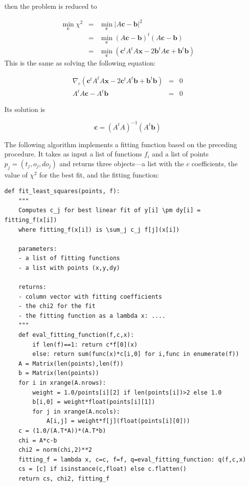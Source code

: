 \documentclass[justified,sixbynine]{tufte-book}
\def\ft{\small\tt}
\theoremstyle{plain}%
\theoremstyle{definition}
\theoremstyle{remark}
\begin{document}
\begin{fullwidth}
then the problem is reduced to

\begin{eqnarray}
\min_{\mathbf{c}}\chi^2 &=& \min_{\mathbf{c}} |A\mathbf{c}-\mathbf{b}|^2 \\
  &=& \min_{\mathbf{c}} (A\mathbf{c}-\mathbf{b})^t (A\mathbf{c}-\mathbf{b}) \\
  &=& \min_{\mathbf{c}} (\mathbf{c}^t A^t A \mathbf x - 2\mathbf{b}^t A \mathbf{c} + \mathbf{b}^t \mathbf{b})
\end{eqnarray}
This is the same as solving the following equation:

\begin{eqnarray}
\nabla_{c} (\mathbf{c}^t A^t A \mathbf x - 2\mathbf{c}^t A^t \mathbf{b} + \mathbf{b}^t\mathbf{b}) &=& 0 \\
A^t A \mathbf{c} - A^t \mathbf{b} &=& 0
\end{eqnarray}

Its solution is

\begin{equation}
\mathbf{c} = (A^t A)^{-1} (A^t \mathbf{b})
\end{equation}

The following algorithm implements a fitting function based on the preceding procedure. It takes as input a list of functions $f_i$ and a list of points $p_j=(t_j,o_j,do_j)$ and returns three objects---a list with the $c$ coefficients, the value of $\chi^2$ for the best fit, and the fitting function:

\begin{lstlisting}[caption={in file: {\ft nlib.py}}]
def fit_least_squares(points, f):
    """
    Computes c_j for best linear fit of y[i] \pm dy[i] = fitting_f(x[i])
    where fitting_f(x[i]) is \sum_j c_j f[j](x[i])

    parameters:
    - a list of fitting functions
    - a list with points (x,y,dy)

    returns:
    - column vector with fitting coefficients
    - the chi2 for the fit
    - the fitting function as a lambda x: ....
    """
    def eval_fitting_function(f,c,x):
        if len(f)==1: return c*f[0](x)
        else: return sum(func(x)*c[i,0] for i,func in enumerate(f))
    A = Matrix(len(points),len(f))
    b = Matrix(len(points))
    for i in xrange(A.nrows):
        weight = 1.0/points[i][2] if len(points[i])>2 else 1.0
        b[i,0] = weight*float(points[i][1])
        for j in xrange(A.ncols):
            A[i,j] = weight*f[j](float(points[i][0]))
    c = (1.0/(A.T*A))*(A.T*b)
    chi = A*c-b
    chi2 = norm(chi,2)**2
    fitting_f = lambda x, c=c, f=f, q=eval_fitting_function: q(f,c,x)
    cs = [c] if isinstance(c,float) else c.flatten()
    return cs, chi2, fitting_f


\end{lstlisting}
\end{fullwidth}
\end{document}
